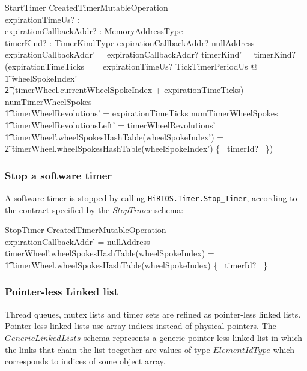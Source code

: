 \documentclass[11pt,letterpaper,twoside,openany]{book}
\begin{document}
\begin{schema}{StartTimer}
   CreatedTimerMutableOperation \\
   expirationTimeUs? : \nat \\
   expirationCallbackAddr? : MemoryAddressType \\
   timerKind? : TimerKindType
\where
   expirationCallbackAddr? \neq nullAddress
\also
   expirationCallbackAddr' = expirationCallbackAddr?
\also
   timerKind' = timerKind?
\also
   (\LET expirationTimeTicks == expirationTimeUs? \div TickTimerPeriodUs @ \\
      \t1 wheelSpokeIndex' = \\
      \t2 (timerWheel.currentWheelSpokeIndex + expirationTimeTicks) \mod numTimerWheelSpokes \land \\
      \t1 timerWheelRevolutions' = expirationTimeTicks \div numTimerWheelSpokes \land \\
      \t1 timerWheelRevolutionsLeft' = timerWheelRevolutions' \land \\
      \t1 timerWheel'.wheelSpokesHashTable(wheelSpokeIndex') = \\
      \t2    timerWheel.wheelSpokesHashTable(wheelSpokeIndex') \cup \{~ timerId? ~\})
\end{schema}

\subsubsection{Stop a software timer}

A software timer is stopped by calling \verb`HiRTOS.Timer.Stop_Timer`, according to the contract
specified by the $StopTimer$ schema:

\begin{schema}{StopTimer}
   CreatedTimerMutableOperation \\
\where
   expirationCallbackAddr' = nullAddress
\also
   timerWheel'.wheelSpokesHashTable(wheelSpokeIndex) = \\
   \t1  timerWheel.wheelSpokesHashTable(wheelSpokeIndex) \setminus \{~ timerId? ~\}
\end{schema}

\subsubsection{Pointer-less Linked list}

Thread queues, mutex lists and timer sets are refined as pointer-less linked lists.
Pointer-less linked lists use array indices instead of physical pointers. The $GenericLinkedLists$
schema represents a generic pointer-less linked list in which the links that chain the
list toegether are values of type $ElementIdType$ which corresponds to indices of some object array.
\end{document}
